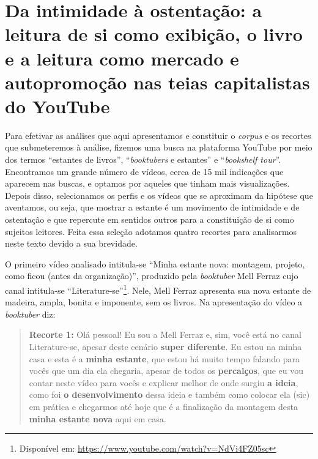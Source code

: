 \section{Da intimidade à ostentação: a leitura de si como
exibição, o livro e a leitura como mercado e autopromoção nas teias
capitalistas do YouTube}\label{sec-daintimidadeaostentação}

Para efetivar as análises que aqui apresentamos e constituir o
\textit{corpus} e os recortes que submeteremos à análise, fizemos uma busca
na plataforma YouTube por meio dos termos \enquote{estantes de livros},
\enquote{\textit{booktubers} e estantes} e \enquote{\textit{bookshelf tour}}. Encontramos 
um grande número de vídeos, cerca de 15 mil indicações que aparecem nas buscas,
e optamos por aqueles que tinham mais
visualizações. Depois disso, selecionamos os perfis e os vídeos que se
aproximam da hipótese que aventamos, ou seja, que mostrar a estante é um
movimento de intimidade e de ostentação e que repercute em sentidos
outros para a constituição de si como sujeitos leitores. Feita essa
seleção adotamos quatro recortes para analisarmos neste texto devido a
sua brevidade.

O primeiro vídeo analisado intitula-se \enquote{Minha estante nova: montagem,
projeto, como ficou (antes da organização)}, produzido pela
\textit{booktuber} Mell Ferraz cujo canal intitula-se
\enquote{Literature-se}\footnote{Disponível em:
  \url{https://www.youtube.com/watch?v=NdVi4FZ05sc}}. Nele, Mell Ferraz
apresenta sua nova estante de madeira, ampla, bonita e imponente, sem os
livros. Na apresentação do vídeo a \textit{booktuber} diz:

\begin{quote}
\textbf{Recorte 1:}
Olá pessoal! Eu sou a Mell Ferraz e, sim, você está no canal
Literature-se, apesar deste cenário \textbf{super diferente}. Eu
estou na minha casa e esta é a \textbf{minha estante}, que estou
há muito tempo falando para vocês que um dia ela chegaria, apesar de
todos os \textbf{percalços}, que eu vou contar neste vídeo para
vocês e explicar melhor de onde surgiu \textbf{a ideia}, como
foi \textbf{o desenvolvimento} dessa ideia e também como colocar
ela (sic) em prática e chegarmos até hoje que é a finalização da
montagem desta \textbf{minha estante nova} aqui em casa.
\end{quote}


